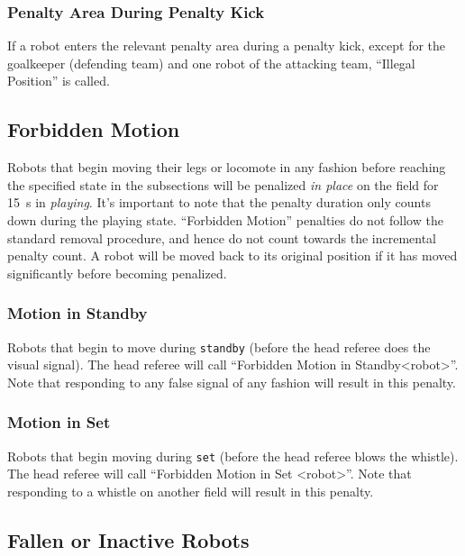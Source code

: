 \subsubsection{Penalty Area During Penalty Kick}
\label{sec:ip_penalty_kick}

If a robot enters the relevant penalty area during a penalty kick, except for the goalkeeper (defending team) and one robot of the attacking team, ``Illegal Position'' is called.

\subsection{Forbidden Motion}
Robots that begin moving their legs or locomote in any fashion before reaching the specified state in the subsections
will be penalized \textit{in place} on the field for \qty{15}{\second} in \textit{playing}. It's important to note that the penalty duration only counts down during the playing state.
``Forbidden Motion'' penalties do not follow the standard removal procedure, and hence do not count towards the incremental penalty count.
A robot will be moved back to its original position if it has moved significantly before becoming penalized.

\subsubsection{Motion in Standby}
\label{sec:motion_in_standby}

Robots that begin to move during \texttt{standby} (\ie before the head referee does the visual signal).
The head referee will call ``Forbidden Motion in Standby\textless robot\textgreater''.
Note that responding to any false signal of any fashion will result in this penalty.

\subsubsection{Motion in Set}
\label{sec:motion_in_set}

Robots that begin moving during \texttt{set} (\ie before the head referee blows the whistle).
The head referee will call ``Forbidden Motion in Set \textless robot\textgreater''.
Note that responding to a whistle on another field will result in this penalty.

\subsection{Fallen or Inactive Robots}
\label{sec:fallenrobots}

